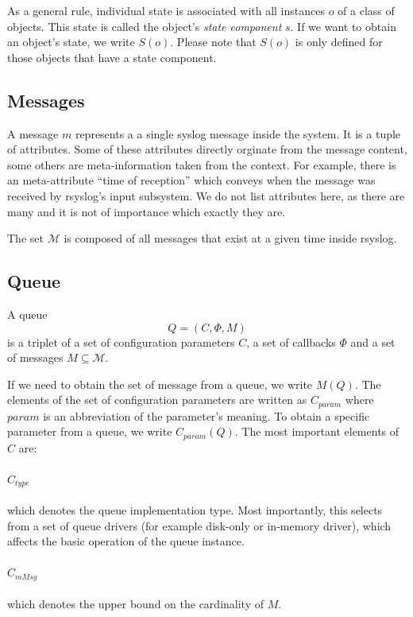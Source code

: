 \documentclass[a4paper,10pt]{article}
\newcommand{\MM}{\mathcal{M}}
\begin{document}
As a general rule, individual state is associated with all instances $o$ of a class of objects. This state is called the object's  \emph{state component} $s$. If we want to obtain an object's state, we write $S(o)$. Please note that $S(o)$ is only defined for those objects that have a state component.

\subsection{Messages} 
A message $m$ represents a a single syslog message inside the system. It is a tuple of attributes. Some of these attributes directly orginate from the message content, some others are meta-information taken from the context. For example, there is an meta-attribute ``time of reception'' which conveys when the message was received by rsyslog's input subsystem. We do not list attributes here, as there are many and it is not of importance which exactly they are.

The set $\MM$ is composed of all messages that exist at a given time inside rsyslog.

\subsection{Queue}
A queue
$$Q = (C, \Phi, M)$$
is a triplet of a set of configuration parameters $C$, a set of callbacks $\Phi$ and a set of messages $M \subseteq \MM$.

If we need to obtain the set of message from a queue, we write $M(Q)$. The elements of the set of configuration parameters are written as $C_{param}$ where $param$ is an abbreviation of the parameter's meaning. To obtain a specific parameter from a queue, we write $C_{param}(Q)$. The most important elements of $C$ are:

\paragraph{$C_{type}$} which denotes the queue implementation type. Most importantly, this selects from a set of queue drivers (for example disk-only or in-memory driver), which affects the basic operation of the queue instance.

\paragraph{$C_{mMsg}$} which denotes the upper bound on the cardinality of $M$.
\end{document}
